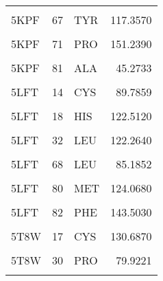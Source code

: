 \begin{table}
\begin{tabular}{lrlr}
			\cellcolor{gray!6}{5KPF} & \cellcolor{gray!6}{32} & \cellcolor{gray!6}{LEU} & \cellcolor{gray!6}{120.1710}\\
			5KPF & 67 & TYR & 117.3570\\
			\cellcolor{gray!6}{5KPF} & \cellcolor{gray!6}{68} & \cellcolor{gray!6}{LEU} & \cellcolor{gray!6}{84.1501}\\
			5KPF & 71 & PRO & 151.2390\\
			\addlinespace
			\cellcolor{gray!6}{5KPF} & \cellcolor{gray!6}{80} & \cellcolor{gray!6}{MET} & \cellcolor{gray!6}{126.7040}\\
			5KPF & 81 & ALA & 45.2733\\
			\cellcolor{gray!6}{5KPF} & \cellcolor{gray!6}{82} & \cellcolor{gray!6}{PHE} & \cellcolor{gray!6}{145.9170}\\
			5LFT & 14 & CYS & 89.7859\\
			\cellcolor{gray!6}{5LFT} & \cellcolor{gray!6}{17} & \cellcolor{gray!6}{CYS} & \cellcolor{gray!6}{131.2330}\\
			\addlinespace
			5LFT & 18 & HIS & 122.5120\\
			\cellcolor{gray!6}{5LFT} & \cellcolor{gray!6}{30} & \cellcolor{gray!6}{PRO} & \cellcolor{gray!6}{78.6390}\\
			5LFT & 32 & LEU & 122.2640\\
			\cellcolor{gray!6}{5LFT} & \cellcolor{gray!6}{67} & \cellcolor{gray!6}{TYR} & \cellcolor{gray!6}{117.9010}\\
			5LFT & 68 & LEU & 85.1852\\
			\addlinespace
			\cellcolor{gray!6}{5LFT} & \cellcolor{gray!6}{71} & \cellcolor{gray!6}{PRO} & \cellcolor{gray!6}{154.1260}\\
			5LFT & 80 & MET & 124.0680\\
			\cellcolor{gray!6}{5LFT} & \cellcolor{gray!6}{81} & \cellcolor{gray!6}{ALA} & \cellcolor{gray!6}{49.6961}\\
			5LFT & 82 & PHE & 143.5030\\
			\cellcolor{gray!6}{5T8W} & \cellcolor{gray!6}{14} & \cellcolor{gray!6}{CYS} & \cellcolor{gray!6}{89.3990}\\
			\addlinespace
			5T8W & 17 & CYS & 130.6870\\
			\cellcolor{gray!6}{5T8W} & \cellcolor{gray!6}{18} & \cellcolor{gray!6}{HIS} & \cellcolor{gray!6}{122.3910}\\
			5T8W & 30 & PRO & 79.9221\\
			\cellcolor{gray!6}{5T8W} & \cellcolor{gray!6}{32} & \cellcolor{gray!6}{LEU} & \cellcolor{gray!6}{121.4370}\\

\end{tabular}
\end{table}
